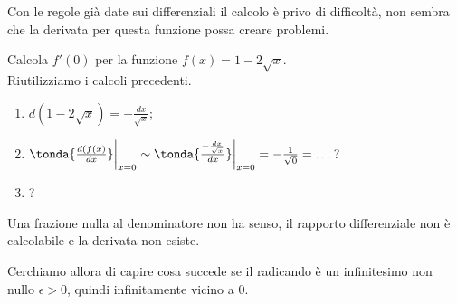 Con le regole già date sui differenziali il calcolo è privo di difficoltà, 
non 
sembra che la derivata per questa funzione possa creare problemi.

\begin{esempio}
  \label{esempio:diff01_deriradice}
Calcola $f'(0)$ per la funzione $f(x)=1-2\sqrt{x}$.\\
Riutilizziamo i calcoli precedenti.
\begin{enumerate} [noitemsep]
 \item $d(1-2\sqrt{x})=-\frac{dx}{\sqrt{x}}$;
 \item $\tonda{\frac{d(f(x)}{dx}}\bigg|_{x=0}\sim
  \tonda{\frac{-\frac{dx}{\sqrt{x}}}{dx}}\bigg|_{x=0}=-\frac{1}{\sqrt{0}}=
  \dots$?
 \item ?
\end{enumerate}
Una frazione nulla al denominatore non ha senso, il rapporto differenziale 
non 
è calcolabile e la derivata non esiste. 
\end{esempio}

Cerchiamo allora di capire cosa succede se il radicando è un infinitesimo 
non 
nullo $\epsilon>0$, quindi infinitamente vicino a 0.


